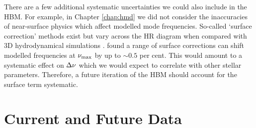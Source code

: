 There are a few additional systematic uncertainties we could also include in the HBM. For example, in Chapter \ref{chap:hmd} we did not consider the inaccuracies of near-surface physics which affect modelled mode frequencies. So-called `surface correction' methods exist \citep[e.g.][]{Ball.Gizon2014,Kjeldsen.Bedding.ea2008} but vary across the HR diagram when compared with 3D hydrodynamical simulations \citep{Sonoi.Samadi.ea2015}. \citet{Compton.Bedding.ea2018} found a range of surface corrections can shift modelled frequencies at \({\nu_\mathrm{max}}\) by up to \(\sim 0.5\) per cent. This would amount to a systematic effect on \({\Delta\nu}\) which we would expect to correlate with other stellar parameters. Therefore, a future iteration of the HBM should account for the surface term systematic.

\section*{Current and Future Data}




